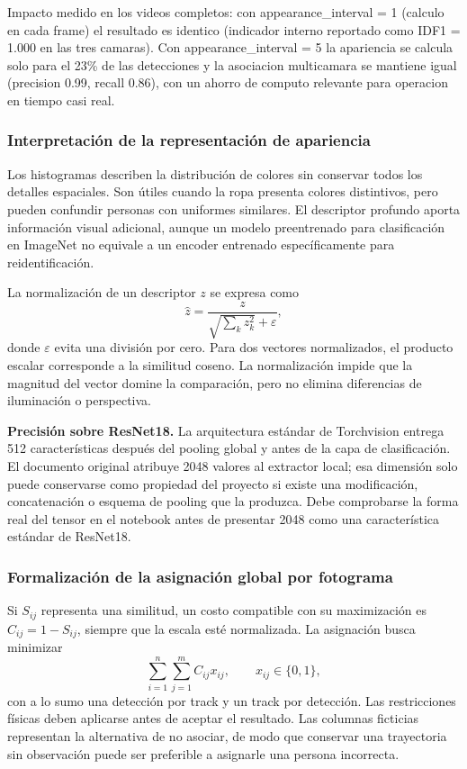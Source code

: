 \documentclass[12pt,letterpaper]{article}
\begin{document}
Impacto medido en los videos completos: con appearance\_interval = 1 (calculo en cada frame) el resultado es identico (indicador interno reportado como IDF1 = 1.000 en las tres camaras). Con appearance\_interval = 5 la apariencia se calcula solo para el 23\% de las detecciones y la asociacion multicamara se mantiene igual (precision 0.99, recall 0.86), con un ahorro de computo relevante para operacion en tiempo casi real.


\subsubsection{Interpretación de la representación de apariencia}
Los histogramas describen la distribución de colores sin conservar todos los detalles espaciales. Son útiles cuando la ropa presenta colores distintivos, pero pueden confundir personas con uniformes similares. El descriptor profundo aporta información visual adicional, aunque un modelo preentrenado para clasificación en ImageNet no equivale a un encoder entrenado específicamente para reidentificación.

La normalización de un descriptor $z$ se expresa como
\[
 \widehat z=\frac{z}{\sqrt{\sum_k z_k^2}+\varepsilon},
\]
donde $\varepsilon$ evita una división por cero. Para dos vectores normalizados, el producto escalar corresponde a la similitud coseno. La normalización impide que la magnitud del vector domine la comparación, pero no elimina diferencias de iluminación o perspectiva.

\textbf{Precisión sobre ResNet18.} La arquitectura estándar de Torchvision entrega 512 características después del pooling global y antes de la capa de clasificación. El documento original atribuye 2048 valores al extractor local; esa dimensión solo puede conservarse como propiedad del proyecto si existe una modificación, concatenación o esquema de pooling que la produzca. Debe comprobarse la forma real del tensor en el notebook antes de presentar 2048 como una característica estándar de ResNet18.

\subsubsection{Formalización de la asignación global por fotograma}
Si $S_{ij}$ representa una similitud, un costo compatible con su maximización es $C_{ij}=1-S_{ij}$, siempre que la escala esté normalizada. La asignación busca minimizar
\[
 \sum_{i=1}^{n}\sum_{j=1}^{m} C_{ij}x_{ij},
 \qquad x_{ij}\in\{0,1\},
\]
con a lo sumo una detección por track y un track por detección. Las restricciones físicas deben aplicarse antes de aceptar el resultado. Las columnas ficticias representan la alternativa de no asociar, de modo que conservar una trayectoria sin observación puede ser preferible a asignarle una persona incorrecta.
\end{document}
